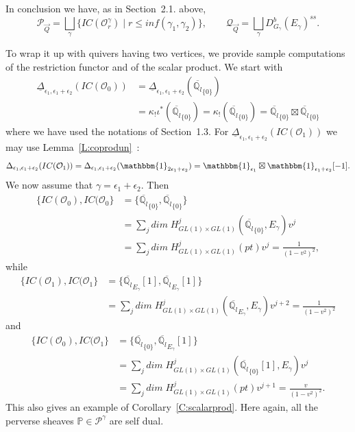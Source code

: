 \documentclass[a4paper,10pt]{amsart}
\def\qlb{\overline{\mathbb{Q}_l}}
\def\QQ{\mathcal{Q}_{\vec{Q}}}
\def\PQ{\mathcal{P}_{\vec{Q}}}
\numberwithin{equation}{section}
\begin{document}
In conclusion we have, as in Section~2.1. above,
$$\PQ=\bigsqcup_{\gamma} \big\{ IC(\mathcal{O}^{\gamma}_r)\;|\; r \leq inf(\gamma_1,\gamma_2)\big\}, \qquad \QQ= \bigsqcup_{\gamma}D^b_{G_{\gamma}}(E_{\gamma})^{ss}.$$

\vspace{.1in}

To wrap it up with quivers having two vertices, we provide sample computations of the restriction functor and of the scalar product.
We start with 
\begin{equation*}
\begin{split}
\underline{\Delta}_{\epsilon_1, \epsilon_1+\epsilon_2}(IC(\mathcal{O}_0))&=\underline{\Delta}_{\epsilon_1, \epsilon_1+\epsilon_2}(\qlb_{\{0\}})\\
&=\kappa_{!}\iota^* (\qlb_{\{0\}})=\kappa_!(\qlb_{\{0\}})=\qlb_{\{0\}} \boxtimes \qlb_{\{0\}}
\end{split}
\end{equation*}
where we have used the notations of Section~1.3. For $\underline{\Delta}_{\epsilon_1, \epsilon_1+\epsilon_2}(IC(\mathcal{O}_1))$ we may use Lemma~\ref{L:coprodun}~:
\begin{equation*}
\Delta_{\epsilon_1, \epsilon_1+\epsilon_2}(IC(\mathcal{O}_1))=\Delta_{\epsilon_1, \epsilon_1+\epsilon_2}(\mathbbm{1}_{2\epsilon_1+\epsilon_2})
=\mathbbm{1}_{\epsilon_1} \boxtimes \mathbbm{1}_{\epsilon_1 + \epsilon_2}[-1].
\end{equation*}
We now assume that $\gamma=\epsilon_1+\epsilon_2$. Then
\begin{equation*}
\begin{split}
\{IC(\mathcal{O}_0), IC(\mathcal{O}_0\}&=\{\qlb_{\{0\}}, \qlb_{\{0\}}\}\\
&=\sum_j dim\; H^j_{GL(1) \times GL(1)}(\qlb_{\{0\}}, E_{\gamma})v^j\\
&=\sum_j dim\;H^j_{GL(1) \times GL(1)}(pt)v^j=\frac{1}{(1-v^2)^2},
\end{split}
\end{equation*}
while
\begin{equation*}
\begin{split}
\{IC(\mathcal{O}_1), IC(\mathcal{O}_1\}&=\{\qlb_{E_{\gamma}}[1], \qlb_{E_{\gamma}}[1]\}\\
&=\sum_j dim\;H^j_{GL(1) \times GL(1)}(\qlb_{E_{\gamma}}, E_{\gamma})v^{j+2}=\frac{1}{(1-v^2)^2}
\end{split}
\end{equation*}
and 
\begin{equation*}
\begin{split}
\{IC(\mathcal{O}_0), IC(\mathcal{O}_1\}&=\{\qlb_{\{0\}}, \qlb_{E_{\gamma}}[1]\}\\
&=\sum_j dim\; H^j_{GL(1) \times GL(1)}(\qlb_{\{0\}}[1], E_{\gamma})v^j\\
&=\sum_j dim\;H^j_{GL(1) \times GL(1)}(pt)v^{j+1}=\frac{v}{(1-v^2)^2}.
\end{split}
\end{equation*}
This also gives an example of Corollary~\ref{C:scalarprod}. Here again, all the perverse sheaves $\mathbb{P} \in \mathcal{P}^{\gamma}$ are self dual.
\end{document}
